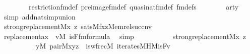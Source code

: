 \begin{isabellebody}
\ \ \ \ \ \ \ \ restriction{\isacharunderscore}{\kern0pt}fm{\isacharunderscore}{\kern0pt}def\ pre{\isacharunderscore}{\kern0pt}image{\isacharunderscore}{\kern0pt}fm{\isacharunderscore}{\kern0pt}def\ quasinat{\isacharunderscore}{\kern0pt}fm{\isacharunderscore}{\kern0pt}def\ fm{\isacharunderscore}{\kern0pt}defs\isanewline
\ \ \ \ \ \ \isamarkupfalse%
\ arty\ \isamarkupfalse%
\ {\isacharparenleft}{\kern0pt}simp\ add{\isacharcolon}{\kern0pt}nat{\isacharunderscore}{\kern0pt}simp{\isacharunderscore}{\kern0pt}union{\isacharparenright}{\kern0pt}\isanewline
\ \ \ \ \isamarkupfalse%
\isanewline
\ \ \ \ \isamarkupfalse%
\ {\isachardoublequoteopen}strong{\isacharunderscore}{\kern0pt}replacement{\isacharparenleft}{\kern0pt}{\isacharhash}{\kern0pt}{\isacharhash}{\kern0pt}M{\isacharcomma}{\kern0pt}{\isasymlambda}x\ z{\isachardot}{\kern0pt}\ sats{\isacharparenleft}{\kern0pt}M{\isacharcomma}{\kern0pt}{\isacharquery}{\kern0pt}f{\isacharcomma}{\kern0pt}{\isacharbrackleft}{\kern0pt}x{\isacharcomma}{\kern0pt}z{\isacharcomma}{\kern0pt}Memrel{\isacharparenleft}{\kern0pt}succ{\isacharparenleft}{\kern0pt}n{\isacharparenright}{\kern0pt}{\isacharparenright}{\kern0pt}{\isacharcomma}{\kern0pt}v{\isacharbrackright}{\kern0pt}{\isacharparenright}{\kern0pt}{\isacharparenright}{\kern0pt}{\isachardoublequoteclose}\isanewline
\ \ \ \ \ \ \isamarkupfalse%
\ replacement{\isacharunderscore}{\kern0pt}ax\ {}\ {\isacartoucheopen}v{\isasymin}M{\isacartoucheclose}\ {\isacartoucheopen}is{\isacharunderscore}{\kern0pt}F{\isacharunderscore}{\kern0pt}fm{\isasymin}formula{\isacartoucheclose}\ \isamarkupfalse%
\ simp\isanewline
\ \ \ \ \isamarkupfalse%
\isanewline
\ \ \ \ \isamarkupfalse%
\ {\isachardoublequoteopen}strong{\isacharunderscore}{\kern0pt}replacement{\isacharparenleft}{\kern0pt}{\isacharhash}{\kern0pt}{\isacharhash}{\kern0pt}M{\isacharcomma}{\kern0pt}{\isasymlambda}x\ z{\isachardot}{\kern0pt}\isanewline
\ \ \ \ \ \ \ \ \ \ {\isasymexists}y{\isasymin}M{\isachardot}{\kern0pt}\ pair{\isacharparenleft}{\kern0pt}{\isacharhash}{\kern0pt}{\isacharhash}{\kern0pt}M{\isacharcomma}{\kern0pt}x{\isacharcomma}{\kern0pt}y{\isacharcomma}{\kern0pt}z{\isacharparenright}{\kern0pt}\ {\isacharampersand}{\kern0pt}\ is{\isacharunderscore}{\kern0pt}wfrec{\isacharparenleft}{\kern0pt}{\isacharhash}{\kern0pt}{\isacharhash}{\kern0pt}M{\isacharcomma}{\kern0pt}\ iterates{\isacharunderscore}{\kern0pt}MH{\isacharparenleft}{\kern0pt}{\isacharhash}{\kern0pt}{\isacharhash}{\kern0pt}M{\isacharcomma}{\kern0pt}is{\isacharunderscore}{\kern0pt}F{\isacharcomma}{\kern0pt}v{\isacharparenright}{\kern0pt}\ {\isacharcomma}{\kern0pt}\isanewline

\end{isabellebody}

